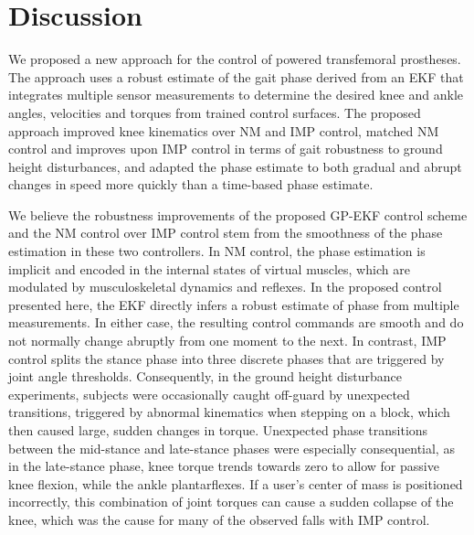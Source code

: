 \section{Discussion}\label{sec:phase_est_discussion}

We proposed a new approach for the control of powered transfemoral prostheses.
The approach uses a robust estimate of the gait phase derived from an EKF that
integrates multiple sensor measurements to determine the desired knee and ankle
angles, velocities and torques from trained control surfaces. The proposed
approach improved knee kinematics over NM and IMP control, matched NM control
and improves upon IMP control in terms of gait robustness to ground height
disturbances, and adapted the phase estimate to both gradual and abrupt changes
in speed more quickly than a time-based phase estimate.

We believe the robustness improvements of the proposed GP-EKF control scheme and
the NM control over IMP control stem from the smoothness of the phase estimation
in these two controllers. In NM control, the phase estimation is implicit and
encoded in the internal states of virtual muscles, which are modulated by
musculoskeletal dynamics and reflexes. In the proposed control presented here,
the EKF directly infers a robust estimate of phase from multiple measurements.
In either case, the resulting control commands are smooth and do not normally
change abruptly from one moment to the next. In contrast, IMP control splits the
stance phase into three discrete phases that are triggered by joint angle
thresholds.  Consequently, in the ground height disturbance experiments,
subjects were occasionally caught off-guard by unexpected transitions, triggered
by abnormal kinematics when stepping on a block, which then caused large, sudden
changes in torque. Unexpected phase transitions between the mid-stance and
late-stance phases were especially consequential, as in the late-stance phase,
knee torque trends towards zero to allow for passive knee flexion, while the
ankle plantarflexes. If a user's center of mass is positioned incorrectly, this
combination of joint torques can cause a sudden collapse of the knee, which was
the cause for many of the observed falls with IMP control. 

